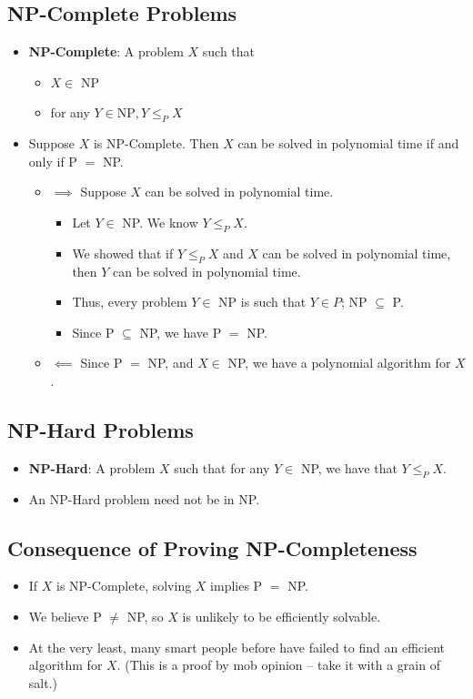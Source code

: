 \subsection{NP-Complete Problems}
\begin{itemize}
    \item \textbf{NP-Complete}: A problem $X$ such that
    \begin{itemize}
        \item $X \in$ NP
        \item for any $Y \in \text{NP}, Y \leq_P X$
    \end{itemize}
    \item Suppose $X$ is NP-Complete. Then $X$ can be solved in polynomial time if and only if P $=$ NP.
    \begin{itemize}
        \item $\implies$ Suppose $X$ can be solved in polynomial time.
        \begin{itemize}
            \item Let $Y \in$ NP. We know $Y \leq_P X$.
            \item We showed that if $Y \leq_P X$ and $X$ can be solved in polynomial time, then $Y$ can be solved in polynomial time.
            \item Thus, every problem $Y \in$ NP is such that $Y \in P$; NP $\subseteq$ P.
            \item Since P $\subseteq$ NP, we have P $=$ NP.
        \end{itemize}
        \item $\impliedby$ Since P $=$ NP, and $X \in$ NP, we have a polynomial algorithm for $X$.
    \end{itemize}
\end{itemize}

\subsection{NP-Hard Problems}
\begin{itemize}
    \item \textbf{NP-Hard}: A problem $X$ such that for any $Y \in$ NP, we have that $Y \leq_P X$.
    \item An NP-Hard problem need not be in NP.
\end{itemize}

\subsection{Consequence of Proving NP-Completeness}
\begin{itemize}
    \item If $X$ is NP-Complete, solving $X$ implies P $=$ NP.
    \item We believe P $\neq$ NP, so $X$ is unlikely to be efficiently solvable.
    \item At the very least, many smart people before have failed to find an efficient algorithm for $X$. (This is a proof by mob opinion -- take it with a grain of salt.)
\end{itemize}

